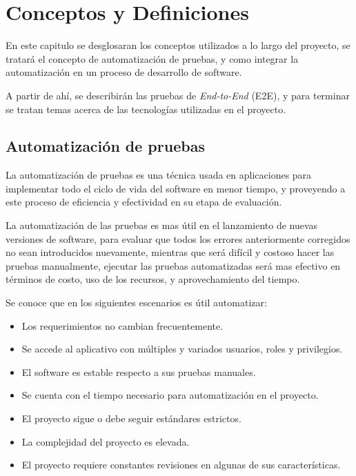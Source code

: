 \chapter{Conceptos y Definiciones}

En este capitulo se desglosaran los conceptos utilizados a lo largo del
proyecto, se tratará el concepto de automatización de pruebas, y como integrar
la automatización en un proceso de desarrollo de software.

A partir de ahí, se describirán las pruebas de \emph{End-to-End} (E2E), y para
terminar se tratan temas acerca de las tecnologías utilizadas en el proyecto.

\section{Automatización de pruebas}
La automatización de pruebas es una técnica usada en aplicaciones para
implementar todo el ciclo de vida del software en menor tiempo, y proveyendo a
este proceso de eficiencia y efectividad en su etapa de evaluación.

La automatización de las pruebas es mas útil en el lanzamiento de nuevas
versiones de software, para evaluar que todos los errores anteriormente
corregidos no sean introducidos nuevamente, mientras que será difícil y costoso
hacer las pruebas manualmente, ejecutar las pruebas automatizadas será mas
efectivo en términos de costo, uso de los recursos, y aprovechamiento del
tiempo.

Se conoce que en los siguientes escenarios es útil automatizar:

\begin{itemize}
    \item Los requerimientos no cambian frecuentemente.
    \item Se accede al aplicativo con múltiples y variados usuarios, roles y
        privilegios.
    \item El software es estable respecto a sus pruebas manuales.
    \item Se cuenta con el tiempo necesario para automatización en el proyecto.
    \item El proyecto sigue o debe seguir estándares estrictos.
    \item La complejidad del proyecto es elevada.
    \item El proyecto requiere constantes revisiones en algunas de sus
    características.
\end{itemize}

